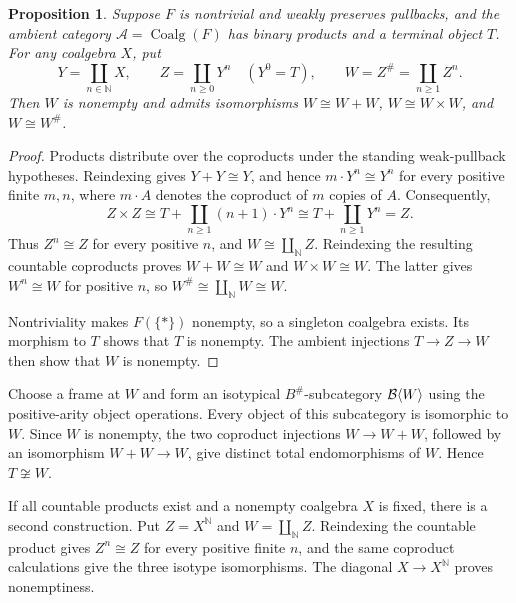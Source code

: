 \documentclass[11pt]{article}
\newtheorem{proposition}[theorem]{Proposition}
\begin{document}
\begin{proposition}\label{prop:coalgebra-isotype}
Suppose $F$ is nontrivial and weakly preserves pullbacks, and the ambient category $\mathcal A=\operatorname{Coalg}(F)$ has binary products and a terminal object $T$. For any coalgebra $X$, put
\[
Y=\coprod_{n\in\mathbb N}X,\qquad
Z=\coprod_{n\geq0}Y^n\quad(Y^0=T),\qquad
W=Z^\#=\coprod_{n\geq1}Z^n.
\]
Then $W$ is nonempty and admits isomorphisms $W\cong W+W$, $W\cong W\times W$, and $W\cong W^\#$.
\end{proposition}
\begin{proof}
Products distribute over the coproducts under the standing weak-pullback hypotheses. Reindexing gives $Y+Y\cong Y$, and hence $m\cdot Y^n\cong Y^n$ for every positive finite $m,n$, where $m\cdot A$ denotes the coproduct of $m$ copies of $A$. Consequently,
\[
Z\times Z\cong T+\coprod_{n\geq1}(n+1)\cdot Y^n
\cong T+\coprod_{n\geq1}Y^n=Z.
\]
Thus $Z^n\cong Z$ for every positive $n$, and $W\cong\coprod_{\mathbb N}Z$. Reindexing the resulting countable coproducts proves $W+W\cong W$ and $W\times W\cong W$. The latter gives $W^n\cong W$ for positive $n$, so $W^\#\cong\coprod_{\mathbb N}W\cong W$.

Nontriviality makes $F(\{*\})$ nonempty, so a singleton coalgebra exists. Its morphism to $T$ shows that $T$ is nonempty. The ambient injections $T\to Z\to W$ then show that $W$ is nonempty.
\end{proof}

Choose a frame at $W$ and form an isotypical $B^\#$-subcategory $\mathcal B\langle W\rangle$ using the positive-arity object operations. Every object of this subcategory is isomorphic to $W$. Since $W$ is nonempty, the two coproduct injections $W\to W+W$, followed by an isomorphism $W+W\to W$, give distinct total endomorphisms of $W$. Hence $T\not\cong W$.

If all countable products exist and a nonempty coalgebra $X$ is fixed, there is a second construction. Put $Z=X^{\mathbb N}$ and $W=\coprod_{\mathbb N}Z$. Reindexing the countable product gives $Z^n\cong Z$ for every positive finite $n$, and the same coproduct calculations give the three isotype isomorphisms. The diagonal $X\to X^{\mathbb N}$ proves nonemptiness.
\end{document}
